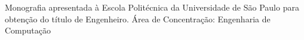 {\large
  Monografia apresentada à Escola Politécnica da Universidade de São Paulo para obtenção do título de Engenheiro.\newline
  \newline
  Área de Concentração:\newline
  Engenharia de Computação\newline
}